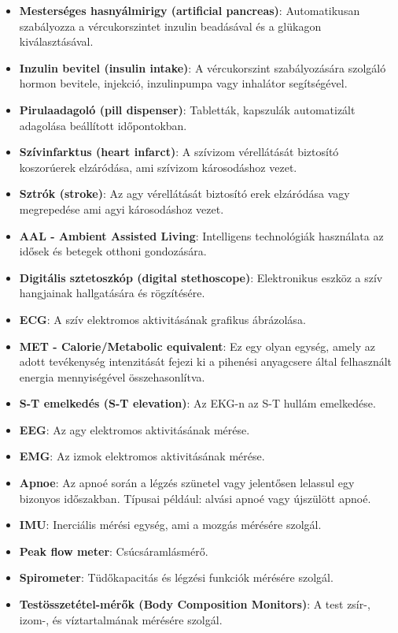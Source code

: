 \begin{itemize}
    \item \textbf{Mesterséges hasnyálmirigy (artificial pancreas)}: Automatikusan szabályozza a vércukorszintet inzulin beadásával és a glükagon kiválasztásával.
    \item \textbf{Inzulin bevitel (insulin intake)}: A vércukorszint szabályozására szolgáló hormon bevitele, injekció, inzulinpumpa vagy inhalátor segítségével.
    \item \textbf{Pirulaadagoló (pill dispenser)}: Tabletták, kapszulák automatizált adagolása beállított időpontokban.
    \item \textbf{Szívinfarktus (heart infarct)}: A szívizom vérellátását biztosító koszorúerek elzáródása, ami szívizom károsodáshoz vezet.
    \item \textbf{Sztrók (stroke)}: Az agy vérellátását biztosító erek elzáródása vagy megrepedése ami agyi károsodáshoz vezet.
    \item \textbf{AAL - Ambient Assisted Living}: Intelligens technológiák használata az idősek és betegek otthoni gondozására.
    \item \textbf{Digitális sztetoszkóp (digital stethoscope)}: Elektronikus eszköz a szív hangjainak hallgatására és rögzítésére.
    \item \textbf{ECG}: A szív elektromos aktivitásának grafikus ábrázolása.
    \item \textbf{MET - Calorie/Metabolic equivalent}: Ez egy olyan egység, amely az adott tevékenység intenzitását fejezi ki a pihenési anyagcsere által felhasznált energia mennyiségével összehasonlítva.
    \item \textbf{S-T emelkedés (S-T elevation)}: Az EKG-n az S-T hullám emelkedése.
    \item \textbf{EEG}: Az agy elektromos aktivitásának mérése.
    \item \textbf{EMG}: Az izmok elektromos aktivitásának mérése.
    \item \textbf{Apnoe}: Az apnoé során a légzés szünetel vagy jelentősen lelassul egy bizonyos időszakban. Típusai például: alvási apnoé vagy újszülött apnoé.
    \item \textbf{IMU}: Inerciális mérési egység, ami a mozgás mérésére szolgál.
    \item \textbf{Peak flow meter}: Csúcsáramlásmérő.
    \item \textbf{Spirometer}: Tüdőkapacitás és légzési funkciók mérésére szolgál.
    \item \textbf{Testösszetétel-mérők (Body Composition Monitors)}: A test zsír-, izom-, és víztartalmának mérésére szolgál.

\end{itemize}
